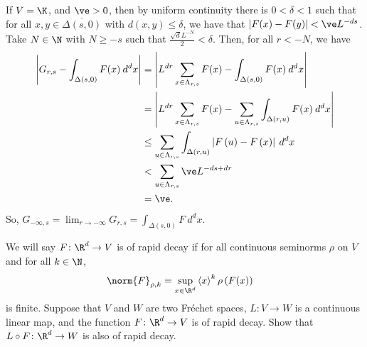 \documentclass[10pt]{mypackage}
\begin{document}
\begin{solution}
  If $V = \K$, and $\ve > 0$, then by uniform continuity there is $0 < \delta < 1$ such that for all $x,y\in \overline{\Delta\left( s,0 \right)}$ with $d\left( x,y \right)\leq \delta$, we have that $\left\vert F(x)-F(y) \right\vert < \ve L^{-ds}$. Take $N\in \N$ with $N\geq -s$ such that $\frac{\sqrt{d}L^{-N}}{2} < \delta$. Then, for all $r < -N$, we have
  \begin{align*}
    \left\vert G_{r,s}- \int_{\Delta\left( s,0 \right)}^{} F(x)\:d^{d}x \right\vert &= \left\vert L^{dr}\sum_{x\in \Lambda_{r,s}}F(x) - \int_{\Delta\left( s,0 \right)}^{} F(x)\:d^{d}x \right\vert\\
                                          &= \left\vert L^{dr}\sum_{x\in \Lambda_{r,s}} F(x) - \sum_{u\in \Lambda_{r,s}} \int_{\Delta\left( r,u \right)}^{} F(x)\:d^{d}x \right\vert\\
                                          &\leq \sum_{u\in \Lambda_{r,s}} \int_{\Delta\left( r,u \right)}^{} \left\vert F\left( u \right)-F\left( x \right) \right\vert\:d^{d}x\\
                                          &< \sum_{u\in \Lambda_{r,s}} \ve L^{-ds + dr}\\
                                          &= \ve.
  \end{align*}
  So, $G_{-\infty,s} = \lim_{r\to-\infty}G_{r,s} = \int_{\Delta\left( s,0 \right)}^{} F\:d^{d}x$.
\end{solution}
\begin{problem}[Problem II.7]
  We will say $F\colon \R^d\to V$ is of rapid decay if for all continuous seminorms $\rho$ on $V$ and for all $k\in \N$,
  \begin{align*}
    \norm{F}_{\rho,k} &= \sup_{x\in \R^d} \left\langle x \right\rangle^{k}\rho\left( F(x) \right)
  \end{align*}
  is finite. Suppose that $V$ and $W$ are two Fréchet spaces, $L\colon V\to W$ is a continuous linear map, and the function $F\colon \R^d\to V$ is of rapid decay. Show that $L\circ F\colon \R^d\to W$ is also of rapid decay.
\end{problem}
\end{document}
